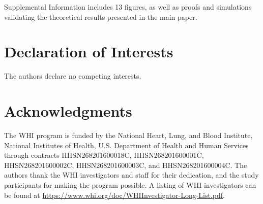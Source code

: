 \documentclass[12pt]{article}
\newcommand{\edit}[1]{{\color{red}{#1}}}
\begin{document}
Supplemental Information includes 13 figures, as well as proofs and simulations validating the theoretical results presented in the main paper.


\section{Declaration of Interests}


\noindent The authors declare no competing interests.




\section{Acknowledgments}


The WHI program is funded by the National Heart, Lung, and Blood Institute, National Institutes of Health, U.S. Department of Health and Human Services through contracts HHSN268201600018C, HHSN268201600001C, HHSN268201600002C, HHSN268201600003C, and HHSN268201600004C. The authors thank the WHI investigators and staff for their dedication, and the study participants for making the program
possible. A listing of WHI investigators can be found at \href{https://www.whi.org/doc/WHIInvestigator-Long-List.pdf}{https://www.whi.org/doc/WHIInvestigator-Long-List.pdf}.
\end{document}
